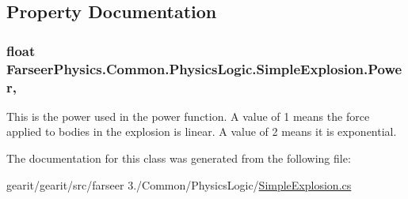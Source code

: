 \subsection{Property Documentation}
\hypertarget{class_farseer_physics_1_1_common_1_1_physics_logic_1_1_simple_explosion_a1289d023050b9f35e6fa2fd3d4133630}{
\subsubsection[{Power}]{\setlength{\rightskip}{0pt plus 5cm}float Farseer\+Physics.\+Common.\+Physics\+Logic.\+Simple\+Explosion.\+Power\hspace{0.3cm}{\ttfamily [get]}, {\ttfamily [set]}}}\label{class_farseer_physics_1_1_common_1_1_physics_logic_1_1_simple_explosion_a1289d023050b9f35e6fa2fd3d4133630}


This is the power used in the power function. A value of 1 means the force applied to bodies in the explosion is linear. A value of 2 means it is exponential. 



The documentation for this class was generated from the following file\+:\begin{DoxyCompactItemize}
\item 
gearit/gearit/src/farseer 3./\+Common/\+Physics\+Logic/\hyperlink{_simple_explosion_8cs}{Simple\+Explosion.\+cs}\end{DoxyCompactItemize}
